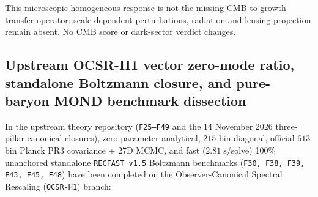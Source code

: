 \documentclass[11pt]{article}
\begin{document}
This microscopic homogeneous response is not the missing CMB-to-growth transfer operator: scale-dependent perturbations, radiation and lensing projection remain absent. No CMB score or dark-sector verdict changes.

\subsection{Upstream OCSR-H1 vector zero-mode ratio, standalone Boltzmann closure, and pure-baryon MOND benchmark dissection}
\label{sec:upstream-ocsr-cmb-20260929}

In the upstream theory repository (\texttt{F25--F49} and the 14 November 2026 three-pillar canonical closures), zero-parameter analytical, $215$-bin diagonal, official $613$-bin Planck PR3 covariance + 27D MCMC, and fast ($2.81\;\mathrm{s}$/solve) 100\% unanchored standalone \texttt{RECFAST v1.5} Boltzmann benchmarks (\texttt{F30, F38, F39, F43, F45, F48}) have been completed on the Observer-Canonical Spectral Rescaling (\texttt{OCSR-H1}) branch:
\end{document}
